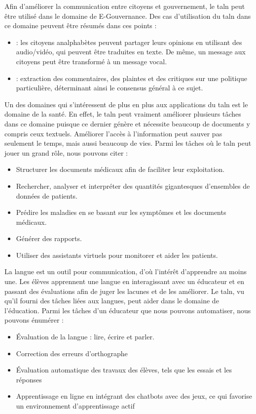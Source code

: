 \documentclass{KodeBook}
\begin{document}
Afin d'améliorer la communication entre citoyens et gouvernement, le \ac{taln} peut être utilisé dans le domaine de E-Gouvernance.
Des cas d'utilisation du \ac{taln} dans ce domaine peuvent être résumés dans ces points :
\begin{itemize}
	\item {} : les citoyens analphabètes peuvent partager leurs opinions en utilisant des audio/vidéo, qui peuvent être traduites en texte. De même, un message aux citoyens peut être transformé à un message vocal.
	\item {} : extraction des commentaires, des plaintes et des critiques sur une politique particulière, déterminant ainsi le consensus général à ce sujet.
\end{itemize}

Un des domaines qui s'intéressent de plus en plus aux applications du \ac{taln} est le domaine de la santé.
En effet, le \ac{taln} peut vraiment améliorer plusieurs tâches dans ce domaine puisque ce dernier génère et nécessite beaucoup de documents y compris ceux textuels.
Améliorer l'accès à l'information peut sauver pas seulement le temps, mais aussi beaucoup de vies.
Parmi les tâches où le \ac{taln} peut jouer un grand rôle, nous pouvons citer :
\begin{itemize}
	\item Structurer les documents médicaux afin de faciliter leur exploitation.
	\item Rechercher, analyser et interpréter des quantités gigantesques d'ensembles de données de patients.
	\item Prédire les maladies en se basant sur les symptômes et les documents médicaux.
	\item Générer des rapports.
	\item Utiliser des assistants virtuels pour monitorer et aider les patients.
\end{itemize}

La langue est un outil pour communication, d'où l'intérêt d'apprendre au moins une. 
Les élèves apprennent une langue en interagissant avec un éducateur et en passant des évaluations afin de juger les lacunes et de les améliorer. 
Le \ac{taln}, vu qu'il fourni des tâches liées aux langues, peut aider dans le domaine de l'éducation.
Parmi les tâches d'un éducateur que nous pouvons automatiser, nous pouvons énumérer :
\begin{itemize}
	\item Évaluation de la langue : lire, écrire et parler.
	\item Correction des erreurs d'orthographe 
	\item Évaluation automatique des travaux des élèves, tels que les essais et les réponses
	\item Apprentissage en ligne en intégrant des chatbots avec des jeux, ce qui favorise un environnement d'apprentissage actif
\end{itemize}
\end{document}
